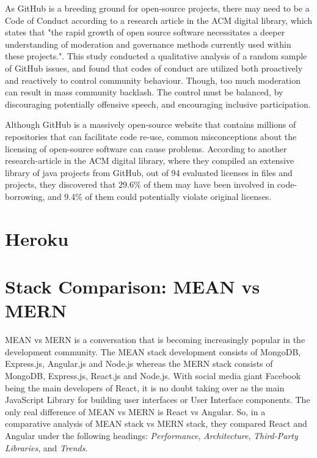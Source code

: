 As GitHub is a breeding ground for open-source projects, there may need to be a Code of Conduct according to a research article in the ACM digital library, which states that "the rapid growth of open source software necessitates a deeper understanding of moderation and governance methods currently used within these projects."\cite{code_of_conduct}. This study conducted a qualitative analysis of a random sample of GitHub issues, and found that codes of conduct are utilized both proactively and reactively to control community behaviour. Though, too much moderation can result in mass community backlash. The control must be balanced, by discouraging potentially offensive speech, and encouraging inclusive participation.

Although GitHub is a massively open-source website that contains millions of repositories that can facilitate code re-use, common misconceptions about the licensing of open-source software can cause problems. According to another research-article in the ACM digital library, where they compiled an extensive library of java projects from GitHub, out of 94 evaluated licenses in files and projects, they discovered that 29.6\% of them may have been involved in code-borrowing, and 9.4\% of them could potentially violate original licenses\cite{code_borrowing}.

\section{Heroku}

\section{Stack Comparison: MEAN vs MERN}
\label{Section:Stack Comparison: MEAN vs MERN}
MEAN vs MERN is a conversation that is becoming increasingly popular in the development community. The MEAN stack development consists of MongoDB, Express.js, Angular.js and Node.js whereas the MERN stack consists of MongoDB, Express.js, React.js and Node.js. With social media giant Facebook being the main developers of React, it is no doubt taking over as the main JavaScript Library for building user interfaces or User Interface components. The only real difference of MEAN vs MERN is React vs Angular. So, in a comparative analysis \cite{aggarwal2018comparative} of MEAN stack vs MERN stack, they compared React and Angular under the following headings: \textit{Performance}, \textit{Architecture}, \textit{Third-Party Libraries}, and \textit{Trends}. 

